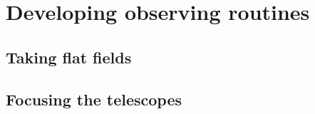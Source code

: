 \newpage
\section{Developing observing routines}
\label{sec:obs_scripts}
\begin{colsection}


\begin{colsection}


\end{colsection}


\subsection{Taking flat fields}
\label{sec:flats}
\begin{colsection}

\citep{flats}

\end{colsection}


\subsection{Focusing the telescopes}
\label{sec:autofocus}
\begin{colsection}

\citep{autofocus}

\end{colsection}


\end{colsection}


\newpage
